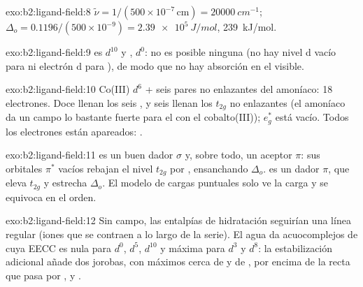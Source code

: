 \begin{solution}{exo:b2:ligand-field:8}
$\tilde\nu = 1/(500 \times 10^{-7}\,\text{cm}) = \qty{20000}{cm^{-1}}$; $\Delta_o =
0.1196/(500 \times 10^{-9}) = \qty{2.39e5}{J/mol}$, \qty{239}{kJ/mol}.
\end{solution}

\begin{solution}{exo:b2:ligand-field:9}
 es $d^{10}$ y , $d^0$: no es posible ninguna  (no hay nivel d vacío
para  ni electrón d para ), de modo que no hay absorción en el visible.
\end{solution}

\begin{solution}{exo:b2:ligand-field:10}
Co(III) $d^6$ + seis pares no enlazantes del amoníaco: 18 electrones. Doce llenan los seis ,
y seis llenan los $t_{2g}$ no enlazantes (el amoníaco da un campo lo bastante fuerte para el  con el
cobalto(III)); $e_g^*$ está vacío. Todos los electrones están apareados: .
\end{solution}

\begin{solution}{exo:b2:ligand-field:11}
 es un buen dador $\sigma$ y, sobre todo, un aceptor $\pi$: sus orbitales $\pi^*$ vacíos
rebajan el nivel $t_{2g}$ por , ensanchando $\Delta_o$.  es un dador $\pi$, que
eleva $t_{2g}$ y estrecha $\Delta_o$. El modelo de cargas puntuales solo ve la carga y se equivoca en el
orden.
\end{solution}

\begin{solution}{exo:b2:ligand-field:12}
Sin campo, las entalpías de hidratación seguirían una línea regular (iones que se contraen a lo largo de
la serie). El agua da acuocomplejos de  cuya EECC es nula para $d^0$, $d^5$, $d^{10}$
y máxima para $d^3$ y $d^8$: la estabilización adicional añade dos jorobas, con máximos cerca de
 y de , por encima de la recta que pasa por ,  y .
\end{solution}

